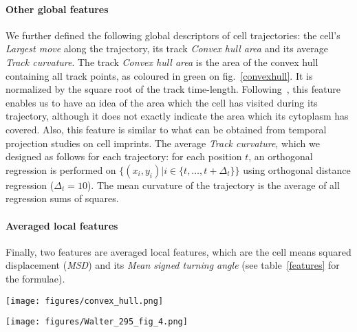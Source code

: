 
\paragraph{Other global features \\}
We further defined the following global descriptors of cell
trajectories: the cell's \textit{Largest move} along the trajectory, its track
\textit{Convex hull area} and its average \textit{Track
  curvature}. The track \textit{Convex hull area} is the area of the
convex hull containing all track points, as coloured in green on
fig.~\ref{convexhull}. It is normalized by the square root of the
track time-length. Following~\cite{pmid18213366}, this feature enables
us to have an idea of the area which the cell has visited during its
trajectory, although it does not exactly indicate the area which its
cytoplasm has covered. Also, this feature is similar to what can be
obtained from temporal projection studies on cell imprints. The average \textit{Track curvature}, which we designed as follows for each trajectory: for each position $t$, an
orthogonal regression is performed on $\{(x_i, y_i) | i \in \{t,\ldots, t+\Delta_t\} \}$ using orthogonal distance regression ($\Delta_t=10$). The mean curvature of the trajectory is the average of all regression sums of squares. 
\paragraph{Averaged local features\\}
Finally, two features are averaged local features, which are the cell
means squared displacement
(\textit{MSD}) and its \textit{Mean signed turning angle} (see table~\ref{features} for the formulae). 
\begin{figure*}[!ht]%
\centerline{\texttt{[image: figures/convex\_hull.png]}}
\caption{Convex hull of the example track from figure~\ref{fig:01}}
\label{convexhull}
\end{figure*}
\begin{figure*}[!tpb]%
\centerline{\texttt{[image: figures/Walter\_295\_fig\_4.png]}}
\caption{Heatmap showing trajectory feature similarities on a subset of the Mitocheck dataset (1.1 million trajectories coming from detected motility hit experiments according to MotIW). The dengrograms were obtained using the \textit{Ward} method and the euclidean distance between feature correlations.}\label{correlations}
\end{figure*}
